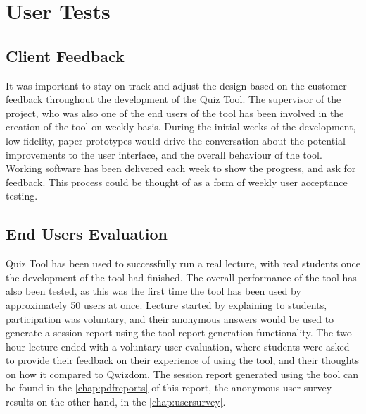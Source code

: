 \section{User Tests}
\subsection{Client Feedback}
It was important to stay on track and adjust the design based on the customer feedback
throughout the development of the Quiz Tool. The supervisor of the project, who was
also one of the end users of the tool has been involved in the creation of the tool on
weekly basis. During the initial weeks of the development, low fidelity, paper prototypes
would drive the conversation about the potential improvements to the user interface, and
the overall behaviour of the tool. Working software has been delivered each week to
show the progress, and ask for feedback. This process could be thought of as a form
of weekly user acceptance testing.

\subsection{End Users Evaluation}
Quiz Tool has been used to successfully run a real lecture, with real students once the
development of the tool had finished. The overall performance of the tool has
also been tested, as this was the first time the tool has been used by
approximately 50 users at once. Lecture started by explaining to students,
participation was voluntary, and their anonymous answers would be used to
generate a session report using the tool report generation functionality.
The two hour lecture ended with a voluntary user evaluation, where students
were asked to provide their feedback on their experience of using the tool,
and their thoughts on how it compared to Qwizdom. The session report generated
using the tool can be found in the \autoref{chap:pdfreports} of this report, the anonymous
user survey results on the other hand, in the \autoref{chap:usersurvey}.
























